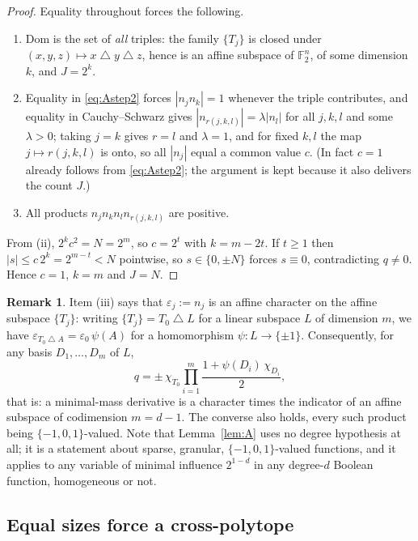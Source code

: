 \documentclass[11pt,reqno]{amsart}
\theoremstyle{plain}
\theoremstyle{definition}
\newtheorem{remark}[theorem]{Remark}
\numberwithin{theorem}{section}
\newcommand{\bits}{\{-1,0,1\}}
\newcommand{\sd}{\mathbin{\triangle}}
\newcommand{\eps}{\varepsilon}
\newcommand{\bbF}{\mathbb{F}}
\begin{document}
\begin{proof}
Equality throughout forces the following.
\begin{enumerate}[label=(\roman*)]
  \item $\mathrm{Dom}$ is the set of \emph{all} triples: the family $\{T_j\}$ is closed under
  $(x,y,z) \mapsto x \sd y \sd z$, hence is an affine subspace of $\bbF_2^n$, of some dimension
  $k$, and $J = 2^k$.
  \item Equality in \eqref{eq:Astep2} forces $|n_j n_k| = 1$ whenever the triple contributes,
  and equality in Cauchy--Schwarz gives $|n_{r(j,k,l)}| = \lambda |n_l|$ for all $j,k,l$ and
  some $\lambda > 0$; taking $j = k$ gives $r = l$ and $\lambda = 1$, and for fixed $k,l$ the
  map $j \mapsto r(j,k,l)$ is onto, so all $|n_j|$ equal a common value $c$. (In fact $c = 1$
  already follows from \eqref{eq:Astep2}; the argument is kept because it also delivers the
  count $J$.)
  \item All products $n_j n_k n_l n_{r(j,k,l)}$ are positive.
\end{enumerate}
From (ii), $2^k c^2 = N = 2^m$, so $c = 2^t$ with $k = m - 2t$. If $t \ge 1$ then
$|s| \le c\,2^k = 2^{m-t} < N$ pointwise, so $s \in \{0,\pm N\}$ forces $s \equiv 0$,
contradicting $q \ne 0$. Hence $c = 1$, $k = m$ and $J = N$.
\end{proof}

\begin{remark}\label{rem:A}
Item (iii) says that $\eps_j := n_j$ is an affine character on the affine subspace $\{T_j\}$:
writing $\{T_j\} = T_0 \sd L$ for a linear subspace $L$ of dimension $m$, we have
$\eps_{T_0 \sd A} = \eps_0\, \psi(A)$ for a homomorphism $\psi \colon L \to \{\pm 1\}$.
Consequently, for any basis $D_1, \dots, D_m$ of $L$,
\[
  q = \pm\, \chi_{T_0} \prod_{i=1}^{m} \frac{1 + \psi(D_i)\,\chi_{D_i}}{2},
\]
that is: a minimal-mass derivative is a character times the indicator of an affine subspace of
codimension $m = d - 1$. The converse also holds, every such product being $\bits$-valued.
Note that Lemma~\ref{lem:A} uses no degree hypothesis at all; it is a statement about sparse,
granular, $\bits$-valued functions, and it applies to any variable of minimal influence
$2^{1-d}$ in any degree-$d$ Boolean function, homogeneous or not.
\end{remark}

\subsection{Equal sizes force a cross-polytope}
\end{document}
